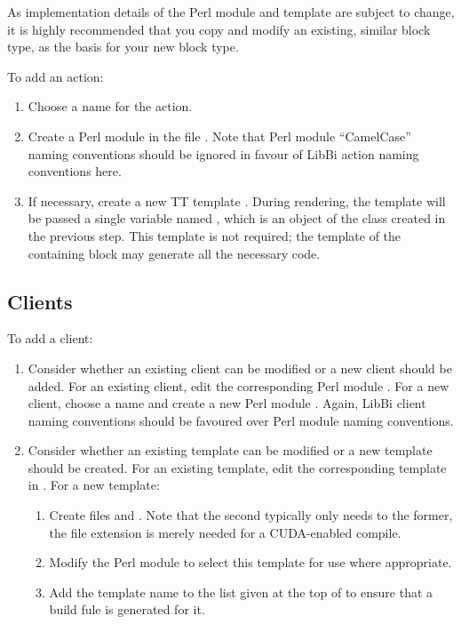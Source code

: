 As implementation details of the Perl module and template are subject to
change, it is highly recommended that you copy and modify an existing, similar
block type, as the basis for your new block type.

To add an action:
\begin{enumerate}
\item Choose a name for the action.
\item Create a Perl module  in the
  file . Note that Perl module
  ``CamelCase'' naming conventions should be ignored in favour of LibBi action
  naming conventions here.
\item If necessary, create a new TT template
  . During rendering, the
  template will be passed a single variable named , which is an
  object of the class created in the previous step. This template is not
  required; the template of the containing block may generate all the
  necessary code.
\end{enumerate}

\subsection{Clients}

To add a client:
\begin{enumerate}
\item Consider whether an existing client can be modified or a new client
  should be added. For an existing client, edit the corresponding Perl module
  . For a new client, choose a name
  and create a new Perl module . Again,
  LibBi client naming conventions should be favoured over Perl module naming
  conventions.
\item Consider whether an existing template can be modified or a new template
  should be created. For an existing template, edit the corresponding template
  in . For a new template:
\begin{enumerate}
\item Create files  and
  . Note that the second
  typically only needs to  the former, the 
  file extension is merely needed for a CUDA-enabled compile.
\item Modify the Perl module to select this template for use where
  appropriate.
\item Add the template name to the list given at the top of
   to ensure that a build fule is generated
  for it.
\end{enumerate}
\end{enumerate}

